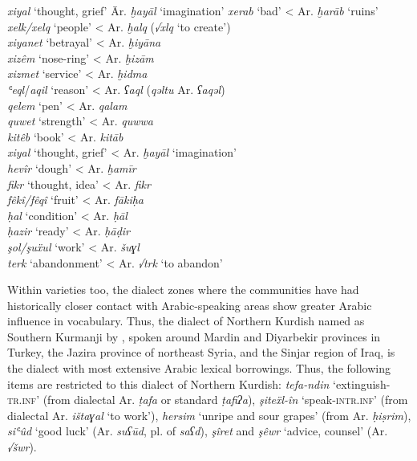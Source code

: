 \documentclass[output=paper]{langsci/langscibook}
\begin{document}
\ea
\begin{tabbing}
\textit{xiyal} ‘thought, grief’ \hspace{1em} \= Ar. \textit{ḫayāl} ‘imagination’\kill
\textit{xerab} ‘bad’     \> < Ar. \textit{ḫarāb} ‘ruins’\\
\textit{xelk/xelq} ‘people’  \> < Ar. \textit{ḫalq} (\textit{√xlq} ‘to create’)\\
\textit{xiyanet} ‘betrayal’  \> < Ar. \textit{ḫiyāna} \\
\textit{xizêm} ‘nose-ring’  \> < Ar. \textit{ḫizām}\\
\textit{xizmet} ‘service’  \> < Ar. \textit{ḫidma} \\
\textit{ʿeql}/\textit{aqil} ‘reason’  \> < Ar. \textit{ʕaql} (\textit{qəltu} Ar. \textit{ʕaqəl})\\
\textit{qelem} ‘pen’    \> < Ar. \textit{qalam}\\
\textit{quwet} ‘strength’  \> < Ar. \textit{quwwa}\\
\textit{kitêb} ‘book’    \> < Ar. \textit{kitāb}\\
\textit{xiyal} ‘thought, grief’  \> < Ar. \textit{ḫayāl} ‘imagination’\\
\textit{hevîr} ‘dough’    \> < Ar. \textit{ḫamīr} \\
\textit{fikr} ‘thought, idea’  \> < Ar. \textit{fikr}\\
\textit{fêkî/fêqî} ‘fruit’  \> < Ar. \textit{fākiḥa}\\
\textit{ḥal} ‘condition’  \> < Ar. \textit{ḥāl} \\
\textit{ḥazir} ‘ready’    \> < Ar. \textit{ḥāḍir}\\
\textit{şol/şuẍul} ‘work’  \> < Ar. \textit{šuɣl} \\
\textit{terk} ‘abandonment’  \> < Ar. \textit{√trk} ‘to abandon’
\end{tabbing}
\z

Within varieties too, the dialect zones where the communities have had historically closer contact with Arabic-speaking areas show greater Arabic influence in vocabulary. Thus, the dialect of Northern Kurdish named as Southern Kurmanji by  \citet{ÖpenginHaig2014}, spoken around Mardin and Diyarbekir provinces in Turkey, the Jazira province of northeast Syria, and the Sinjar region of Iraq, is the dialect with most extensive Arabic lexical borrowings. Thus, the following items are restricted to this dialect of Northern Kurdish: \textit{tefa-ndin} ‘extinguish-\textsc{tr.inf}’ (from dialectal Ar. \textit{ṭafa} or standard \textit{ṭafiʔa}), \textit{şiteẍl-în} ‘speak-\textsc{intr.inf}’ (from dialectal Ar. \textit{ištaɣal} ‘to work’), \textit{hersim} ‘unripe and sour grapes’ (from Ar. \textit{ḥiṣrim}), \textit{siʿûd} ‘good luck’ (Ar. \textit{suʕūd}, pl. of \textit{saʕd}), \textit{şîret} and \textit{şêwr} ‘advice, counsel’ (Ar. \textit{√šwr}).     
\end{document}
